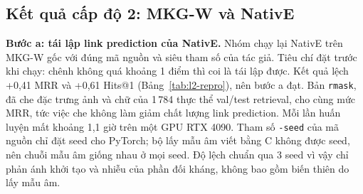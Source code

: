 \subsection{Kết quả cấp độ 2: MKG-W và NativE}
\label{sec:l2}

\textbf{Bước a: tái lập link prediction của NativE.}
Nhóm chạy lại NativE trên MKG-W gốc với đúng mã nguồn và siêu tham số của tác giả. Tiêu chí đặt trước khi chạy: chênh không
quá khoảng 1 điểm thì coi là tái lập được. Kết quả lệch +0,41 MRR và +0,61 Hits@1 (Bảng~\ref{tab:l2-repro}), nên bước a đạt.
Bản \texttt{rmask}, đã che đặc trưng ảnh và chữ của 1\,784 thực thể val/test retrieval, cho cùng mức MRR, tức việc che
không làm giảm chất lượng link prediction. Mỗi lần huấn luyện mất khoảng 1,1 giờ trên một GPU RTX 4090. Tham số
\texttt{-seed} của mã nguồn chỉ đặt seed cho PyTorch; bộ lấy mẫu âm viết bằng C không được seed, nên chuỗi mẫu âm giống nhau
ở mọi seed. Độ lệch chuẩn qua 3 seed vì vậy chỉ phản ánh khởi tạo và nhiễu của phần đối kháng, không bao gồm biến thiên do
lấy mẫu âm.

\begin{table}[t]
\centering
\caption{Link prediction trên tập test KGC của MKG-W (filtered). Bài báo chỉ công bố MRR và Hits@1 cho MKG-W. Dòng rmask:
3 seed.}
\label{tab:l2-repro}
\footnotesize
\setlength{\tabcolsep}{3pt}
\end{table}

